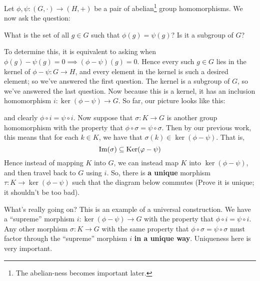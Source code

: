     Let $\phi, \psi: (G, \cdot)  \to (H, +)$ be a pair of abelian\footnote{The abelian-ness becomes important later.} 
    group homomorphisms. We now ask the question:
    \begin{center}
        \textcolor{NavyBlue}{What is the set of all $g \in G$ such that $\phi(g) = \psi(g)$? Is it a subgroup of $G$?}
    \end{center}
    To determine this, it is equivalent to asking when $\phi(g) - \psi(g) = 0 
    \implies (\phi - \psi)(g) = 0$. Hence every such $g \in G$ lies in the kernel of 
    $\phi - \psi: G \to H$, and every element in the kernel is such a desired element; so 
    we've answered the first question. The kernel is a subgroup of $G$, so we've answered the last question. 
    Now because this is a kernel, it has an inclusion 
    homomorphism $i: \ker(\phi - \psi) \to G$. So far, our picture looks like this:
    \begin{center}
    \end{center}
    and clearly $\phi \circ i = \psi \circ i$. 
    Now suppose that $\sigma: K \to G$ is another group homomorphism with the property 
    that $\phi \circ \sigma = \psi \circ \sigma$. Then by our previous work, this means 
    that for each $k \in K$, we have that $\sigma(k)\in\ker(\phi - \psi)$. That is, 
    \[
        \operatorname{\rm{Im}}(\sigma) \subseteq \operatorname{\mathrm{Ker}}(\varphi - \psi)  
    \]
    Hence instead of mapping $K$ into $G$, we can instead map $K$ into $\ker(\phi - \psi)$, 
    and then travel back to $G$ using $i$.
    So, there is \textbf{a unique} morphism $\tau: K \to \ker(\phi - \psi)$
    such that the diagram below commutes (Prove it is unique; it shouldn't be too bad).
    \begin{center}
    \end{center}    
    What's really going on? This is an example of a universal construction. We have a 
    ``supreme'' morphism $i: \ker(\phi -\psi) \to G$ with the property that $\phi \circ i = \psi \circ i$.
    Any other morphism $\sigma: K \to G$ with the same property that $\phi\circ\sigma = \psi \circ \sigma$ 
    must factor through the ``supreme'' morphism $i$ \textbf{in a unique way}. Uniqueness here is 
    very important. 

